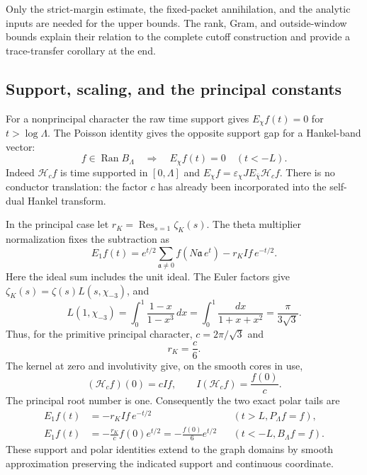 Only the strict-margin estimate, the fixed-packet annihilation, and the
analytic inputs are needed for the upper bounds. The rank, Gram, and
outside-window bounds explain their relation to the complete cutoff
construction and provide a trace-transfer corollary at the end.

\subsection{Support, scaling, and the principal constants}

For a nonprincipal character the raw time support gives
$E_\chi f(t)=0$ for $t>\log\Lambda$. The Poisson identity gives the
opposite support gap for a Hankel-band vector:
\[
 f\in\operatorname{Ran}B_\Lambda
       \quad\Longrightarrow\quad E_\chi f(t)=0\quad(t<-L).
\]
Indeed $\mathcal H_cf$ is time supported in $[0,\Lambda]$ and
$E_\chi f=\varepsilon_\chi J E_{\bar\chi}\mathcal H_cf$.
There is no conductor translation: the factor $c$ has already been
incorporated into the self-dual Hankel transform.

In the principal case let $r_K=\operatorname{Res}_{s=1}\zeta_K(s)$.
The theta multiplier normalization fixes the subtraction as
\[
 E_1f(t)=e^{t/2}\sum_{\mathfrak a\ne0}
                  f(N\mathfrak a\,e^t)-r_KIf\,e^{-t/2}.
\]
Here the ideal sum includes the unit ideal. The Euler factors give
$\zeta_K(s)=\zeta(s)L(s,\chi_{-3})$, and
\[
 L(1,\chi_{-3})
 =\int_0^1\frac{1-x}{1-x^3}\,dx
 =\int_0^1\frac{dx}{1+x+x^2}
 =\frac{\pi}{3\sqrt3}.
\]
Thus, for the primitive principal character, $c=2\pi/\sqrt3$ and
\begin{equation}\label{eq:hi-principal-residue}
                         r_K=\frac c6.
\end{equation}
The kernel at zero and involutivity give, on the smooth cores in use,
\begin{equation}\label{eq:hi-hankel-coordinates}
        (\mathcal H_cf)(0)=cIf,
        \qquad I(\mathcal H_cf)=\frac{f(0)}c.
\end{equation}
The principal root number is one. Consequently the two exact polar tails
are
\begin{align}
 E_1f(t)&=-r_KIf\,e^{-t/2} &&(t>L, P_\Lambda f=f),
 \label{eq:hi-upper-polar}\\
 E_1f(t)&=-\frac{r_K}{c}f(0)e^{t/2}
          =-\frac{f(0)}6e^{t/2}
                         &&(t<-L, B_\Lambda f=f).
 \label{eq:hi-lower-polar}
\end{align}
These support and polar identities extend to the graph domains by smooth
approximation preserving the indicated support and continuous coordinate.

